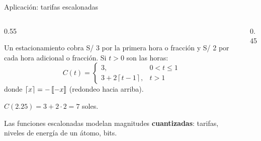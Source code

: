 \documentclass[10pt,aspectratio=169]{beamer}
\begin{document}
\begin{frame}{Aplicación: tarifas escalonadas}
  \begin{columns}
    \begin{column}{0.55\textwidth}
      \begin{ejemplo}[estacionamiento]
        Un estacionamiento cobra S/ 3 por la primera hora o fracción y S/ 2 por cada hora adicional o fracción. Si $t>0$ son las horas:
        \[ C(t)=\begin{cases}3,&0<t\le1\\ 3+2\left\lceil t-1\right\rceil,&t>1\end{cases} \]
        donde $\lceil x\rceil=-\left\llbracket -x\right\rrbracket$ (redondeo hacia arriba).
        \medskip

        $C(2.25)=3+2\cdot2=7$ soles.
      \end{ejemplo}
      \begin{observacion}
        Las funciones escalonadas modelan magnitudes \textbf{cuantizadas}: tarifas, niveles de energía de un átomo, bits.
      \end{observacion}
    \end{column}
    \begin{column}{0.45\textwidth}
      \centering
    \end{column}
  \end{columns}
\end{frame}
\end{document}
